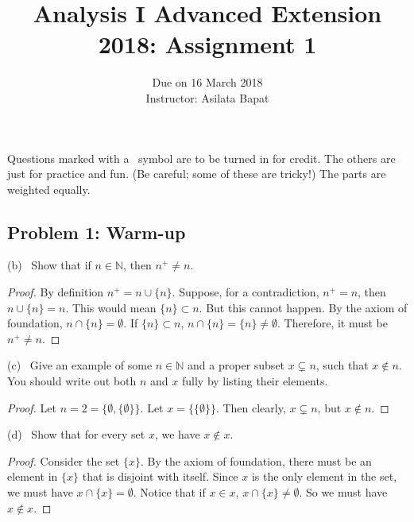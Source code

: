 \documentclass[12pt,a4paper]{amsart}
\title{Analysis I Advanced Extension 2018: Assignment 1}
\author{Due on 16 March 2018\\Instructor: Asilata Bapat}
\newcommand{\suc}[1]{#1^+}
\newcommand{\bbN}{\mathbb{N}}
\newcommand{\turnin}{\faPencilSquareO}
\newcommand{\set}[1]{\{#1\}}
\begin{document}
\maketitle

\noindent Questions marked with a \turnin\ symbol are to be turned in for credit.
The others are just for practice and fun.
(Be careful; some of these are tricky!)
The parts are weighted equally.

\subsection*{Problem 1: Warm-up}

\begin{compactenum}[(a)]
  \setlength{\itemsep}{0.5em}
\item[(b)] \turnin\ Show that if $n \in \bbN$, then $\suc{n} \neq n$.

\begin{proof}
By definition $\suc{n} = n \cup \{n\}$.
Suppose, for a contradiction, $\suc{n} = n$, then $n \cup \{n\} = n$.
This would mean $\{n\} \subset n$. But this cannot happen.
By the axiom of foundation, $n \cap \{n\} = \emptyset$.
If $\{n\} \subset n$, $n \cap \{n\} = \{n\} \neq \emptyset$.
Therefore, it must be $\suc{n} \neq n$.
\end{proof}

\item[(c)] \turnin\ Give an example of some $n \in \bbN$ and a proper subset $x \subsetneq n$, such that $x \notin n$.
  You should write out both $n$ and $x$ fully by listing their elements.

\begin{proof}
  Let $n = 2 = \set{ \emptyset, \set{\emptyset} }$. Let $x = \set{\set{\emptyset}}$.
  Then clearly, $x \subsetneq n$, but $x \notin n$.
\end{proof}

\item[(d)] \turnin\ Show that for every set $x$, we have $x \notin x$.

\begin{proof}
Consider the set $\set{x}$. By the axiom of foundation, there must be an element in $\set{x}$
that is disjoint with itself. Since $x$ is the only element in the set, we must have $x \cap \set{x} = \emptyset$.
Notice that if $x \in x$, $x \cap \set{x} \neq \emptyset$. So we must have $x \notin x$.
\end{proof}

\end{compactenum}
\end{document}
